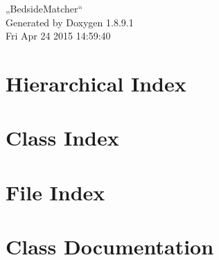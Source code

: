 \documentclass[twoside]{book}
\newcommand{\+}{\discretionary{\mbox{\scriptsize$\hookleftarrow$}}{}{}}
\newcommand{\clearemptydoublepage}{%
  \newpage{\pagestyle{empty}\cleardoublepage}%
}
\begin{document}
\hypersetup{pageanchor=false,
             bookmarks=true,
             bookmarksnumbered=true,
             pdfencoding=unicode
            }
\begin{titlepage}
\vspace*{7cm}
\begin{center}%
{\Large „\+Bedside\+Matcher“ }\\
\vspace*{1cm}
{\large Generated by Doxygen 1.8.9.1}\\
\vspace*{0.5cm}
{\small Fri Apr 24 2015 14:59:40}\\
\end{center}
\end{titlepage}
\clearemptydoublepage
\tableofcontents
\clearemptydoublepage
{}
\hypersetup{pageanchor=true}

\chapter{Hierarchical Index}

\chapter{Class Index}

\chapter{File Index}

\chapter{Class Documentation}














\end{document}
